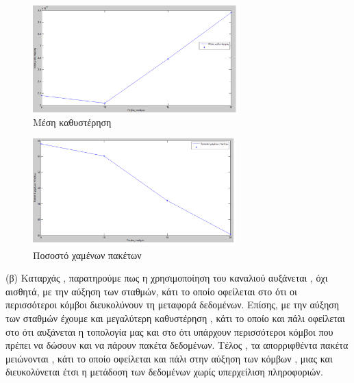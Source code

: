 \documentclass{article}%
\begin{document}
\begin{figure}[htbp]
	\centering
		\includegraphics[width=0.7\textwidth]{5.png}
	\caption{Μέση καθυστέρηση}
	\label{fig:5}
\end{figure}


\begin{figure}[htbp]
	\centering
		\includegraphics[width=0.7\textwidth]{6.png}
	\caption{Ποσοστό χαμένων πακέτων}
	\label{fig:6}
\end{figure}
\newpage
(β) Καταρχάς , παρατηρούμε πως η χρησιμοποίηση του καναλιού αυξάνεται , όχι αισθητά, με την αύξηση των σταθμών, κάτι το οποίο οφείλεται στο ότι οι περισσότεροι κόμβοι διευκολύνουν τη μεταφορά δεδομένων. Επίσης, με την αύξηση των σταθμών έχουμε και μεγαλύτερη καθυστέρηση , κάτι το οποίο και πάλι οφείλεται στο ότι αυξάνεται η τοπολογία μας και στο ότι υπάρχουν περισσότεροι κόμβοι που πρέπει να δώσουν και να πάρουν πακέτα δεδομένων. Τέλος , τα απορριφθέντα πακέτα μειώνονται , κάτι το οποίο οφείλεται και πάλι στην αύξηση των κόμβων , μιας και διευκολύνεται έτσι η μετάδοση των δεδομένων χωρίς υπερχείλιση πληροφοριών.
\end{document}
